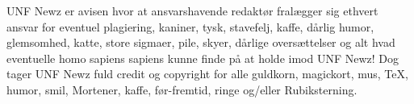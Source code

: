 \begin{minipage}[b]{0.95\linewidth}
\begin{center}
\tiny UNF Newz er avisen hvor at ansvarshavende redaktør fralægger sig ethvert ansvar for eventuel plagiering, kaniner, tysk, stavefelj, kaffe, dårlig humor, glemsomhed, katte, store sigmaer, pile, skyer, dårlige oversættelser og alt hvad eventuelle homo sapiens sapiens kunne finde på at holde imod UNF Newz! Dog tager UNF Newz fuld credit og copyright for alle guldkorn, magickort, mus, \TeX, humor, smil, Mortener, kaffe, før-fremtid, ringe og/eller Rubiksterning.
\end{center}
\end{minipage}

